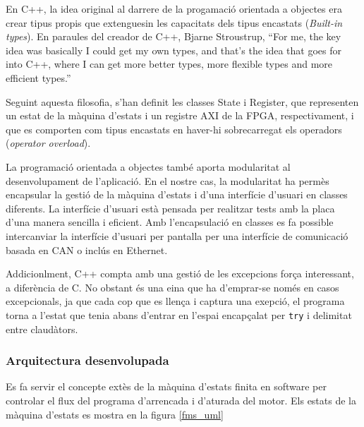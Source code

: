 {{        En C++, la idea original al darrere de la progamació orientada a
        objectes era crear tipus propis que extenguesin les capacitats dels
        tipus encastats (\emph{Built-in types}). En paraules del creador de C++,
        Bjarne Stroustrup, ``For me, the key idea was basically I could get my
        own types, and that's the idea that goes for into C++, where I can get
        more better types, more flexible types and more efficient types.'' 
        \cite{lex}
        
        Seguint aquesta filosofia, s'han definit les classes State i Register,
        que representen un estat de la màquina d'estats i un registre AXI de la
        FPGA, respectivament, i que es comporten com tipus encastats en
        haver-hi sobrecarregat els operadors (\emph{operator overload}).

        La programació orientada a objectes també aporta modularitat al
        desenvolupament de l'aplicació. En el nostre cas, la modularitat ha
        permès encapsular la gestió de la màquina d'estats i d'una interfície
        d'usuari en classes diferents. La interfície d'usuari està pensada per
        realitzar tests amb la placa d'una manera sencilla i eficient. Amb
        l'encapsulació en classes es fa possible intercanviar la interfície
        d'usuari per pantalla per una interfície de comunicació basada en CAN o
        inclús en Ethernet.

        Addicionlment, C++ compta amb una gestió de les excepcions força
        interessant, a diferència de C. No obstant és una eina que ha
        d'emprar-se només en casos excepcionals, ja que cada cop que es llença
        i captura una exepció, el programa torna a l'estat que tenia abans
        d'entrar en l'espai encapçalat per \lstinline{try} i delimitat entre
        claudàtors.
    }

    \subsubsection{ Arquitectura desenvolupada }
    {        
        Es fa servir el concepte extès de la màquina d'estats finita en
        software per controlar el flux del programa d'arrencada i d'aturada del
        motor. Els estats de la màquina d'estats es mostra en la figura
        \ref{fms_uml}

}}
